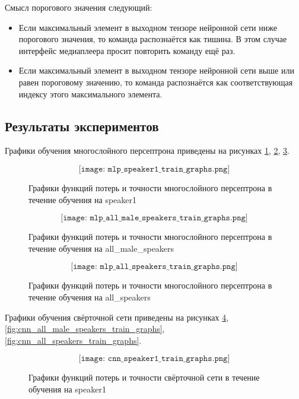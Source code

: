 Смысл порогового значения следующий:
\begin{itemize}[leftmargin=2cm]
	\item Если максимальный элемент в выходном тензоре нейронной сети ниже порогового значения, то команда распознаётся как тишина. В этом случае интерфейс медиаплеера просит повторить команду ещё раз. 
	\item Если максимальный элемент в выходном тензоре нейронной сети выше или равен пороговому значению, то команда распознаётся как соответствующая индексу этого максимального элемента. 
\end{itemize}
\subsection{Результаты экспериментов}
Графики обучения многослойного персептрона приведены на рисунках \ref{fig:mlp_speaker1_train_graphs}, \ref{fig:mlp_all_male_speakers_train_graphs}, \ref{fig:mlp_all_speakers_train_graphs}.

\begin{figure}[H]
	\[\texttt{[image: mlp\_speaker1\_train\_graphs.png]}\]
	\caption{Графики функций потерь и точности многослойного персептрона в течение обучения на speaker1}
	\label{fig:mlp_speaker1_train_graphs}
\end{figure}

\begin{figure}[H]
	\[\texttt{[image: mlp\_all\_male\_speakers\_train\_graphs.png]}\]
	\caption{Графики функций потерь и точности многослойного персептрона в течение обучения на all\_male\_speakers}
	\label{fig:mlp_all_male_speakers_train_graphs}
\end{figure}

\begin{figure}[H]
	\[\texttt{[image: mlp\_all\_speakers\_train\_graphs.png]}\]
	\caption{Графики функций потерь и точности многослойного персептрона в течение обучения на all\_speakers}
	\label{fig:mlp_all_speakers_train_graphs}
\end{figure}


Графики обучения свёрточной сети приведены на рисунках \ref{fig:cnn_speaker1_train_graphs}, \ref{fig:cnn_all_male_speakers_train_graphs}, \ref{fig:cnn_all_speakers_train_graphs}.

\begin{figure}[H]
	\[\texttt{[image: cnn\_speaker1\_train\_graphs.png]}\]
	\caption{Графики функций потерь и точности свёрточной сети в течение обучения на speaker1}
	\label{fig:cnn_speaker1_train_graphs}
\end{figure}

